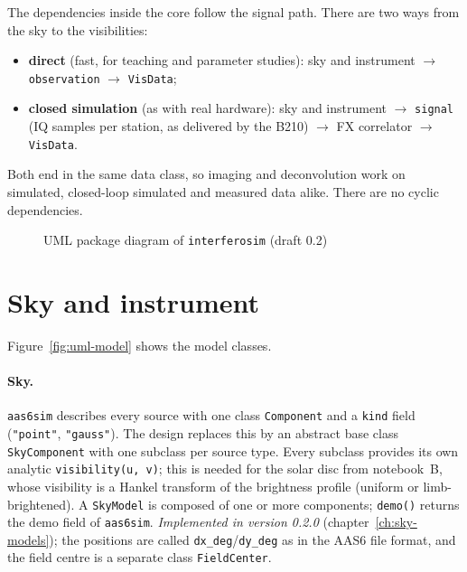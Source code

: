 The dependencies inside the core follow the signal path. There are two
ways from the sky to the visibilities:
\begin{itemize}
  \item \textbf{direct} (fast, for teaching and parameter studies):
        sky and instrument $\rightarrow$ \texttt{observation}
        $\rightarrow$ \texttt{VisData};
  \item \textbf{closed simulation} (as with real hardware): sky and
        instrument $\rightarrow$ \texttt{signal} (IQ samples per
        station, as delivered by the B210) $\rightarrow$ FX correlator
        $\rightarrow$ \texttt{VisData}.
\end{itemize}
Both end in the same data class, so imaging and deconvolution work on
simulated, closed-loop simulated and measured data alike. There are no
cyclic dependencies.

\begin{figure}[htbp]
  \centering
  \resizebox{\linewidth}{!}{}
  \caption{UML package diagram of \texttt{interferosim} (draft 0.2)}
  \label{fig:uml-packages}
\end{figure}

\section{Sky and instrument}

Figure~\ref{fig:uml-model} shows the model classes.

\paragraph*{Sky.} \texttt{aas6sim} describes every source with one class
\texttt{Component} and a \texttt{kind} field (\texttt{"point"},
\texttt{"gauss"}). The design replaces this by an abstract base class
\texttt{SkyComponent} with one subclass per source type. Every subclass
provides its own analytic \texttt{visibility(u, v)}; this is needed for
the solar disc from notebook~B, whose visibility is a Hankel transform
of the brightness profile (uniform or limb-brightened). A
\texttt{SkyModel} is composed of one or more components; \texttt{demo()}
returns the demo field of \texttt{aas6sim}. \emph{Implemented in version 0.2.0}
(chapter~\ref{ch:sky-models}); the positions are called
\texttt{dx\_deg}/\texttt{dy\_deg} as in the AAS6 file format, and the
field centre is a separate class \texttt{FieldCenter}.

